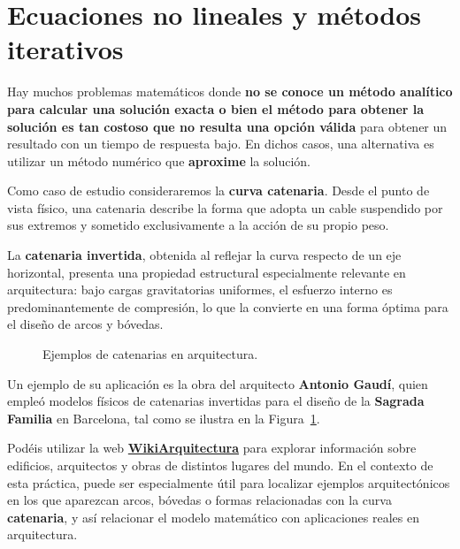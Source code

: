 \documentclass[
  spanish,
  11pt,
  a4paper,
  DIV=11,
  numbers=noendperiod]{scrartcl}
\begin{document}
\section{Ecuaciones no lineales y métodos iterativos}
\label{ecuaciones-no-lineales-y-metodos-iterativos}

Hay muchos problemas matemáticos donde \textbf{no se conoce un método analítico para calcular una solución exacta o bien el método para obtener la solución es tan costoso que no resulta una opción válida} para obtener un resultado con un tiempo de respuesta bajo. En dichos casos, una alternativa es utilizar un método numérico que \textbf{aproxime} la solución.

Como caso de estudio consideraremos la \textbf{curva catenaria}. Desde el punto de vista físico, una catenaria describe la forma que adopta un cable suspendido por sus extremos y sometido exclusivamente a la acción de su propio peso.

La \textbf{catenaria invertida}, obtenida al reflejar la curva respecto de un eje horizontal, presenta una propiedad estructural especialmente relevante en arquitectura: bajo cargas gravitatorias uniformes, el esfuerzo interno es predominantemente de compresión, lo que la convierte en una forma óptima para el diseño de arcos y bóvedas.

\begin{figure}[H]
\caption{Ejemplos de catenarias en arquitectura. }\label{fig-ejemplos-catenarias}
\end{figure}

Un ejemplo de su aplicación es la obra del arquitecto \textbf{Antonio Gaudí}, quien empleó modelos físicos de catenarias invertidas para el diseño de la \textbf{Sagrada Familia} en Barcelona, tal como se ilustra en la Figura~\ref{fig-ejemplos-catenarias}.

Podéis utilizar la web \href{https://es.wikiarquitectura.com/}{\textbf{WikiArquitectura}} para explorar información sobre edificios, arquitectos y obras de distintos lugares del mundo. En el contexto de esta práctica, puede ser especialmente útil para localizar ejemplos arquitectónicos en los que aparezcan arcos, bóvedas o formas relacionadas con la curva \textbf{catenaria}, y así relacionar el modelo matemático con aplicaciones reales en arquitectura.
\end{document}
